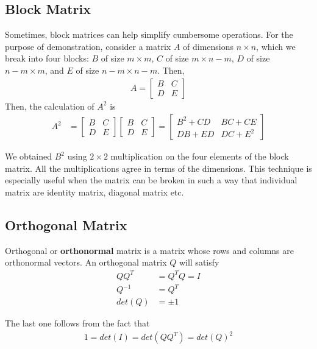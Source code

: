 \documentclass[../../linear_algebra.tex]{subfiles}
\begin{document}
\subsection{Block Matrix}
Sometimes, block matrices can help simplify cumbersome operations. For the purpose of demonstration, consider a matrix $A$ of dimensions $n \times n$, which we break into four blocks: $B$ of size $m \times m$, $C$ of size $m \times n-m$, $D$ of size $n-m \times m$, and $E$ of size $n-m \times n-m$. Then,
\begin{align*}
    A = \begin{bmatrix}
        B &C\\ D &E
    \end{bmatrix}
\end{align*}
Then, the calculation of $A^{2}$ is
\begin{align*}
    A^{2} &= \begin{bmatrix}
        B &C\\ D &E
    \end{bmatrix}
    \begin{bmatrix}
        B &C\\ D &E
    \end{bmatrix} =
    \begin{bmatrix}
        B^{2} + CD &BC + CE\\ DB + ED &DC + E^{2}
    \end{bmatrix}
\end{align*}

We obtained $B^{2}$ using $2 \times 2$ multiplication on the four elements of the block matrix. All the multiplications agree in terms of the dimensions. This technique is especially useful when the matrix can be broken in such a way that individual matrix are identity matrix, diagonal matrix etc.

\subsection{Orthogonal Matrix}
Orthogonal or \textbf{orthonormal} matrix is a matrix whose rows and columns are orthonormal vectors. An orthogonal matrix $Q$ will satisfy
\begin{align*}
    QQ^{T} &= Q^{T}Q = I\\
    Q^{-1} &= Q^{T}\\
    det(Q) &= \pm 1
\end{align*}

The last one follows from the fact that
\begin{align*}
    1 = det(I) = det(QQ^{T}) = det(Q)^{2}
\end{align*}
\end{document}
